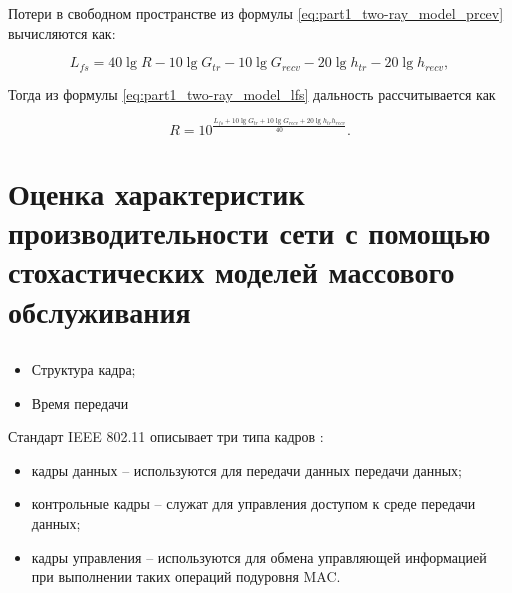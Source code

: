 Потери в свободном пространстве из формулы \cref{eq:part1_two-ray_model_prcev} вычисляются как:

\begin{equation}
  \label{eq:part1_two-ray_model_lfs}
  L_{fs} = 40\lg{R} - 10\lg{G_{tr}} - 10\lg{G_{recv}} - 20\lg{h_{tr}} - 20\lg{h_{recv}},
\end{equation}

Тогда из формулы \cref{eq:part1_two-ray_model_lfs} дальность рассчитывается как

\begin{equation}
  \label{eq:part1_two-ray_model_r}
  R = 10^\frac{L_{fs} + 10\lg{G_{tr}} + 10\lg{G_{recv}} + 20\lg{h_{tr}h_{recv}}}{40}.
\end{equation}



\subsection{}

\section{Оценка характеристик производительности сети с помощью стохастических моделей массового обслуживания}

\subsection{}

\begin{itemize}
  \item Структура кадра;
  \item Время передачи 
\end{itemize}

Стандарт IEEE 802.11 описывает три типа кадров \cite{Proletarsky}:
\begin{itemize}
  \item кадры данных -- используются для передачи данных передачи данных;
  \item контрольные кадры -- служат для управления доступом к среде передачи данных;
  \item кадры управления -- используются для обмена управляющей информацией при выполнении таких операций подуровня MAC.
\end{itemize}

